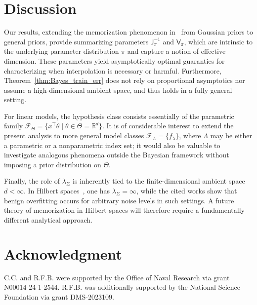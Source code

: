 \documentclass[11pt]{article}
\newcommand{\jfunc}{\mathsf{J}}
\begin{document}
\section{Discussion} \label{sec:discussion}
Our results, extending the memorization phenomenon in~\citet{cheng2022memorize} from Gaussian priors to general priors, provide summarizing parameters $\jfunc_\pi^{-1}$ and $\mathsf{V}_\pi$, which are intrinsic to the underlying parameter distribution $\pi$ and capture a notion of effective dimension. These parameters yield asymptotically optimal guaranties for characterizing when interpolation is necessary or harmful. Furthermore, Theorem~\ref{thm:Bayes_train_err} does not rely on proportional asymptotics nor assume a high-dimensional ambient space, and thus holds in a fully general setting.

For linear models, the hypothesis class consists essentially of the parametric family  $\mathcal{F}_\Theta = \{x^\top \theta \mid \theta \in \Theta = \mathbb{R}^d\}$. It is of considerable interest to extend the present analysis to more general model classes \(\mathcal{F}_\Lambda = \{f_\lambda\}\), where \(\Lambda\) may be either a parametric or a nonparametric index set; it would also be valuable to investigate analogous phenomena outside the Bayesian framework without imposing a prior distribution on \(\Theta\).  

Finally, the role of \(\lambda_\Sigma\) is inherently tied to the finite-dimensional ambient space \(d < \infty\). In Hilbert spaces~\citep{bartlett2020benign, cheng2024dimension}, one has \(\lambda_\Sigma = \infty\), while the cited works show that benign overfitting occurs for arbitrary noise levels in such settings. A future theory of memorization in Hilbert spaces will therefore require a fundamentally different analytical approach.

% 

% 

% 



\section*{Acknowledgment}
C.C. and R.F.B. were supported by the Office of Naval Research via grant N00014-24-1-2544. R.F.B. was additionally supported by the National Science Foundation via grant DMS-2023109.



\end{document}
